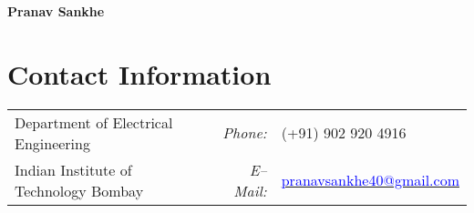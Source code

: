 \documentclass[margin,line, 9pt]{res}
\newenvironment{list1}{
  \begin{list}{\ding{113}}{%
      \setlength{\itemsep}{0in}
      \setlength{\parsep}{0in} \setlength{\parskip}{0in}
      \setlength{\topsep}{0in} \setlength{\partopsep}{0in} 
      \setlength{\leftmargin}{0.17in}}}{\end{list}}
\begin{document}
% 
\textbf{\huge{Pranav Sankhe}}

\section{\sc Contact Information}
\begin{tabular}{@{}p{2.9in}p{.5in}p{3in}}
Department of Electrical Engineering & \multicolumn{1}{r}{\it Phone:}  &(+91) 902 920 4916 \\            
Indian Institute of Technology Bombay &\multicolumn{1}{r}{\it E--Mail:}& \href{mailto:pranavsankhe40@gmail.com}{\textcolor{blue}{pranavsankhe40@gmail.com}} \\ 
\end{tabular}

% 
% 
% 
% 
% 
% 
%
\end{document}
